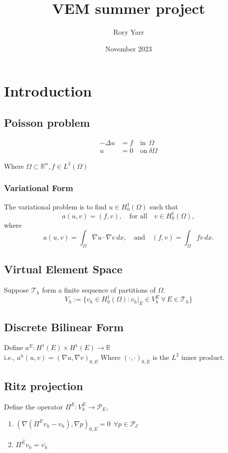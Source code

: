 \documentclass{article}
\title{VEM summer project}
\author{Rory Yarr}
\date{November 2023}
\begin{document}
\maketitle

\section{Introduction}

\subsection{Poisson problem}
\begin{align*}
    -\Delta{u} & = f \quad  \text{in}\ \ \Omega \\
    u & = 0 \quad  \text{on}\ \delta\Omega
\end{align*}

Where $\Omega \subset \mathbb{R}^n, f \in L^2(\Omega)$ %

\subsubsection{Variational Form}
The variational problem is to find $ u \in H^1_0(\Omega)$ such that 
\[ a(u,v) = (f,v), \quad \text{for all} \quad v \in H^1_0(\Omega),\]
where 
\[ a(u,v) = \int_{\Omega} \nabla u \cdot \nabla v \,dx, \quad \text{and}\quad 
(f,v) =\int_{\Omega} f v \,dx. \]


\subsection{Virtual Element Space}
Suppose $\mathcal{T}_h$ form a finite sequence of partitions of $\Omega$.
$$V_h:= \{v_h \in H^1_0(\Omega):v_h|_E \in V_h^E\  \forall \, E \in \mathcal{T}_h\}$$  

\subsection{Discrete Bilinear Form}
Define $a^E:H^1(E)\times H^1(E)\rightarrow \mathbb{R}$\\
i.e., $a^h(u,v)=(\nabla u,\nabla v)_{0,E}$
Where $(\cdot,\cdot)_{0,E}$ is the $L^2$ inner product.

\subsection{Ritz projection}
Define the operator $\Pi^E: V_h^E \rightarrow \mathcal{P}_E$,
\begin{enumerate}
    \item $(\nabla(\Pi^Ev_h-v_h),\nabla p)_{0,E} = 0 \hspace{5pt} \forall p \in \mathcal{P_E}$
    \item $\overline{\Pi^Ev_h} = \overline{v_h}$
\end{enumerate}
\end{document}
